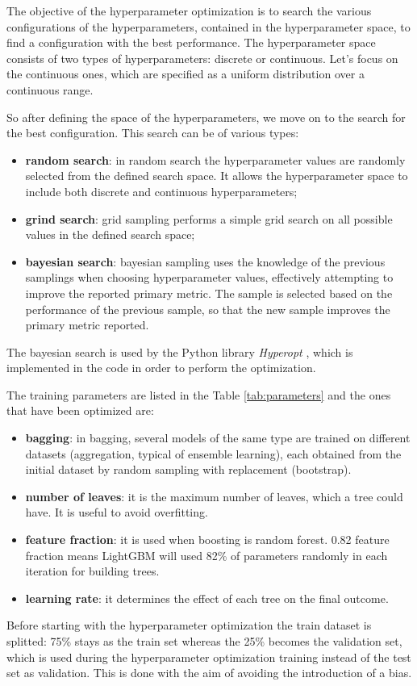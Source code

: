 \documentclass[a4paper, oneside]{book}
\begin{document}
				The objective of the hyperparameter optimization is to search the various configurations of the hyperparameters, contained in the hyperparameter space, to find a configuration with the best performance. The hyperparameter space consists of two types of hyperparameters: discrete or continuous. Let's focus on the continuous ones, which are specified as a uniform distribution over a continuous range. 
				
				So after defining the space of the hyperparameters, we move on to the search for the best configuration. This search can be of various types:
				\begin{itemize}
					\item \textbf{random search}: in random search the hyperparameter values are randomly selected from the defined search space. It allows the  hyperparameter space to include both discrete and continuous hyperparameters;
					\item \textbf{grind search}: grid sampling performs a simple grid search on all possible values in the defined search space;
					\item \textbf{bayesian search}: bayesian sampling uses the knowledge of the previous samplings when choosing hyperparameter values, effectively attempting to improve the reported primary metric. The sample is selected based on the performance of the previous sample, so that the new sample improves the primary metric reported. 
				\end{itemize}
				The bayesian search is used by the Python library \textit{Hyperopt} \cite{Hyperopt}, which is implemented in the code in order to perform the optimization.
				
				The training parameters are listed in the Table \ref{tab:parameters} and the ones that have been optimized are:
				\begin{itemize}
					\item \textbf{bagging}: in bagging, several models of the same type are trained on different datasets (aggregation, typical of ensemble learning), each obtained from the initial dataset by random sampling with replacement (bootstrap).
					\item \textbf{number of leaves}: it is the maximum number of leaves, which a tree could have. It is useful to avoid overfitting.
					\item \textbf{feature fraction}: it is used when boosting is random forest. 0.82 feature fraction means LightGBM will used 82\% of parameters randomly in each iteration for building trees.
					\item \textbf{learning rate}: it determines the effect of each tree on the final outcome.
				\end{itemize}
				Before starting with the hyperparameter optimization the train dataset is splitted: 75\% stays as the train set whereas the 25\% becomes the validation set, which is used during the hyperparameter optimization training instead of the test set as validation. This is done with the aim of avoiding the introduction of a bias.
				
\end{document}
